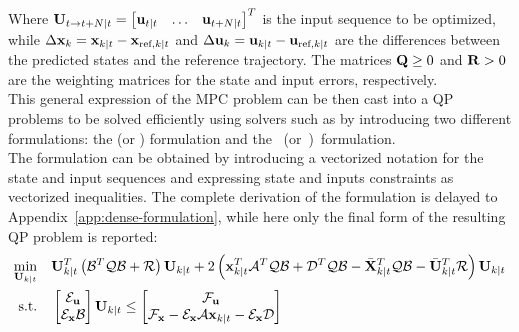 \documentclass[../main.tex]{subfiles}
\begin{document}
Where $\mathbf{U}_{t \to t+N | t} = \begin{bmatrix} \mathbf{u}_{t | t} & \ldots &
\mathbf{u}_{t+N | t} \end{bmatrix}^T$ is the input sequence to be optimized, while
$\Delta \mathbf{x}_k = \mathbf{x}_{k | t} - \mathbf{x}_{\text{ref},k | t}$ and $\Delta \mathbf{u}_k =
\mathbf{u}_{k | t} - \mathbf{u}_{\text{ref},k | t}$ are the differences between the predicted
states and the reference trajectory. 
The matrices $\mathbf{Q} \geq 0$ and $\mathbf{R} > 0$ are
the weighting matrices for the state and input errors, respectively.\\
This general expression of the MPC problem can be then cast into a QP
problems to be solved efficiently using solvers such as 
 by introducing two different formulations: the  (or
) formulation and the \mbox{ (or
)~formulation}.\\
The  formulation can be obtained by introducing a vectorized notation
for the state and input sequences and expressing state and inputs constraints as vectorized inequalities. The complete derivation of the
 formulation is delayed to Appendix~\ref{app:dense-formulation},
while here only the final form of the resulting QP problem is reported:
\begin{equation}\label{eq:dense-formulation}
	\begin{aligned}
		\min_{\mathbf{U}_{k | t}} \quad & \mathbf{U}_{k | t}^T \left( \mathcal{B}^T
			\mathcal{Q} \mathcal{B} + \mathcal{R} \right) \mathbf{U}_{k | t} + 2 \left(
			\mathbf{x}_{k | t}^T
	\mathcal{A}^T \mathcal{Q} \mathcal{B} + \mathcal{D}^T \mathcal{Q} \mathcal{B} -
\bar{\mathbf{X}}_{k | t}^T \mathcal{Q} \mathcal{B} - \bar{\mathbf{U}}_{k | t}^T \mathcal{R} \right)
\mathbf{U}_{k | t}\\
		\text{s.t.} \quad & 
		\begin{bmatrix}
			\mathcal{E}_{\mathbf{u}}\\
			\mathcal{E}_{\mathbf{x}} \mathcal{B}
		\end{bmatrix} \mathbf{U}_{k | t} \leq
		\begin{bmatrix}
			\mathcal{F}_{\mathbf{u}}\\
			\mathcal{F}_{\mathbf{x}} - \mathcal{E}_{\mathbf{x}} \mathcal{A} \mathbf{x}_{k |
			t} - \mathcal{E}_{\mathbf{x}} \mathcal{D}
		\end{bmatrix}
		\end{aligned}
\end{equation}
\end{document}
